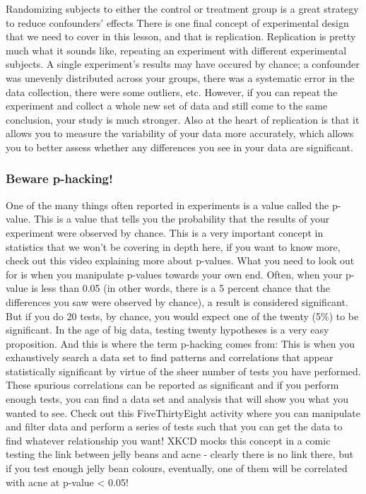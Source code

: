 \documentclass[
]{book}
\begin{document}
Randomizing subjects to either the control or treatment group is a great strategy to reduce confounders' effects
There is one final concept of experimental design that we need to cover in this lesson, and that is replication. Replication is pretty much what it sounds like, repeating an experiment with different experimental subjects. A single experiment's results may have occured by chance; a confounder was unevenly distributed across your groups, there was a systematic error in the data collection, there were some outliers, etc. However, if you can repeat the experiment and collect a whole new set of data and still come to the same conclusion, your study is much stronger. Also at the heart of replication is that it allows you to measure the variability of your data more accurately, which allows you to better assess whether any differences you see in your data are significant.

\hypertarget{beware-p-hacking}{%
\subsubsection{Beware p-hacking!}\label{beware-p-hacking}}

One of the many things often reported in experiments is a value called the p-value. This is a value that tells you the probability that the results of your experiment were observed by chance. This is a very important concept in statistics that we won't be covering in depth here, if you want to know more, check out this video explaining more about p-values.
What you need to look out for is when you manipulate p-values towards your own end. Often, when your p-value is less than 0.05 (in other words, there is a 5 percent chance that the differences you saw were observed by chance), a result is considered significant. But if you do 20 tests, by chance, you would expect one of the twenty (5\%) to be significant. In the age of big data, testing twenty hypotheses is a very easy proposition. And this is where the term p-hacking comes from: This is when you exhaustively search a data set to find patterns and correlations that appear statistically significant by virtue of the sheer number of tests you have performed. These spurious correlations can be reported as significant and if you perform enough tests, you can find a data set and analysis that will show you what you wanted to see.
Check out this FiveThirtyEight activity where you can manipulate and filter data and perform a series of tests such that you can get the data to find whatever relationship you want!
XKCD mocks this concept in a comic testing the link between jelly beans and acne - clearly there is no link there, but if you test enough jelly bean colours, eventually, one of them will be correlated with acne at p-value \textless{} 0.05!
\end{document}
